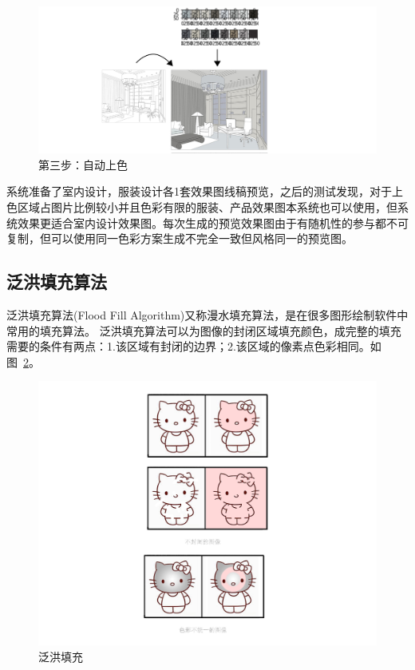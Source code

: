 \begin{figure}[!htbp]
\centering
\includegraphics[width=\linewidth,keepaspectratio]{data/chapter-1/系统内部逻辑3.jpg}
\caption{第三步：自动上色}
\label{figure:系统内部逻辑提取}
\end{figure}

系统准备了室内设计，服装设计各1套效果图线稿预览，之后的测试发现，对于上色区域占图片比例较小并且色彩有限的服装、产品效果图本系统也可以使用，但系统效果更适合室内设计效果图。每次生成的预览效果图由于有随机性的参与都不可复制，但可以使用同一色彩方案生成不完全一致但风格同一的预览图。

\subsection{泛洪填充算法}

泛洪填充算法(Flood Fill Algorithm)又称漫水填充算法，是在很多图形绘制软件中常用的填充算法。\cite{floodfill} 泛洪填充算法可以为图像的封闭区域填充颜色，成完整的填充需要的条件有两点：1.该区域有封闭的边界；2.该区域的像素点色彩相同。如图~\ref{figure:泛洪填充}。

\begin{figure}[!htbp]
\centering
\includegraphics[width=\linewidth,keepaspectratio]{data/chapter-1/kitty.jpg}
\caption{泛洪填充}
\label{figure:泛洪填充}
\end{figure}

